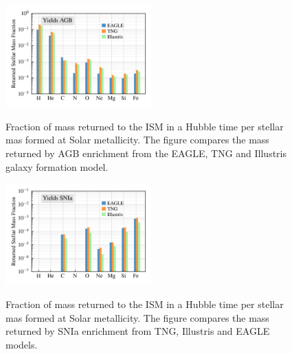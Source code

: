 \documentclass[11pt,a4paper,fleqn,usenatbib,twocolumn]{mnras}
\begin{document}
\begin{figure} 
\begin{center}
\includegraphics[angle=0,width=0.5\textwidth]{../figures/Comparison_AGBYield_tables_NoCOLIBRE.png}\\
\caption{Fraction of mass returned to the ISM in a Hubble time per stellar mas formed at Solar metallicity. The figure compares the mass returned by AGB enrichment from the EAGLE, TNG and Illustris galaxy formation model.}
\label{AGByields}
\end{center}
\end{figure}

\begin{figure} 
\begin{center}
\includegraphics[angle=0,width=0.5\textwidth]{../figures/Comparison_SNIaYield_tables_NoCOLIBRE.png}\\
\caption{Fraction of mass returned to the ISM in a Hubble time per stellar mas formed at Solar metallicity. The figure compares the mass returned by SNIa enrichment from TNG, Illustris and EAGLE models.}
\label{SNIayields}
\end{center}
\end{figure}
\end{document}
